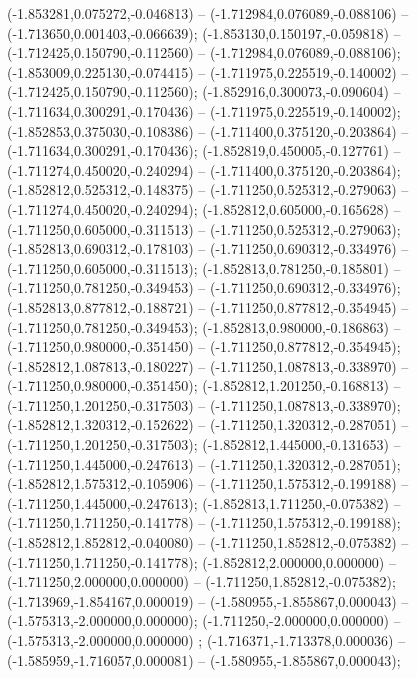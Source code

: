  (-1.853281,0.075272,-0.046813) -- (-1.712984,0.076089,-0.088106) -- (-1.713650,0.001403,-0.066639);
 (-1.853130,0.150197,-0.059818) -- (-1.712425,0.150790,-0.112560) -- (-1.712984,0.076089,-0.088106);
 (-1.853009,0.225130,-0.074415) -- (-1.711975,0.225519,-0.140002) -- (-1.712425,0.150790,-0.112560);
 (-1.852916,0.300073,-0.090604) -- (-1.711634,0.300291,-0.170436) -- (-1.711975,0.225519,-0.140002);
 (-1.852853,0.375030,-0.108386) -- (-1.711400,0.375120,-0.203864) -- (-1.711634,0.300291,-0.170436);
 (-1.852819,0.450005,-0.127761) -- (-1.711274,0.450020,-0.240294) -- (-1.711400,0.375120,-0.203864);
 (-1.852812,0.525312,-0.148375) -- (-1.711250,0.525312,-0.279063) -- (-1.711274,0.450020,-0.240294);
 (-1.852812,0.605000,-0.165628) -- (-1.711250,0.605000,-0.311513) -- (-1.711250,0.525312,-0.279063);
 (-1.852813,0.690312,-0.178103) -- (-1.711250,0.690312,-0.334976) -- (-1.711250,0.605000,-0.311513);
 (-1.852813,0.781250,-0.185801) -- (-1.711250,0.781250,-0.349453) -- (-1.711250,0.690312,-0.334976);
 (-1.852813,0.877812,-0.188721) -- (-1.711250,0.877812,-0.354945) -- (-1.711250,0.781250,-0.349453);
 (-1.852813,0.980000,-0.186863) -- (-1.711250,0.980000,-0.351450) -- (-1.711250,0.877812,-0.354945);
 (-1.852812,1.087813,-0.180227) -- (-1.711250,1.087813,-0.338970) -- (-1.711250,0.980000,-0.351450);
 (-1.852812,1.201250,-0.168813) -- (-1.711250,1.201250,-0.317503) -- (-1.711250,1.087813,-0.338970);
 (-1.852812,1.320312,-0.152622) -- (-1.711250,1.320312,-0.287051) -- (-1.711250,1.201250,-0.317503);
 (-1.852812,1.445000,-0.131653) -- (-1.711250,1.445000,-0.247613) -- (-1.711250,1.320312,-0.287051);
 (-1.852812,1.575312,-0.105906) -- (-1.711250,1.575312,-0.199188) -- (-1.711250,1.445000,-0.247613);
 (-1.852813,1.711250,-0.075382) -- (-1.711250,1.711250,-0.141778) -- (-1.711250,1.575312,-0.199188);
 (-1.852812,1.852812,-0.040080) -- (-1.711250,1.852812,-0.075382) -- (-1.711250,1.711250,-0.141778);
 (-1.852812,2.000000,0.000000) -- (-1.711250,2.000000,0.000000) -- (-1.711250,1.852812,-0.075382);
 (-1.713969,-1.854167,0.000019) -- (-1.580955,-1.855867,0.000043) -- (-1.575313,-2.000000,0.000000);
 (-1.711250,-2.000000,0.000000) -- (-1.575313,-2.000000,0.000000) ;
 (-1.716371,-1.713378,0.000036) -- (-1.585959,-1.716057,0.000081) -- (-1.580955,-1.855867,0.000043);
